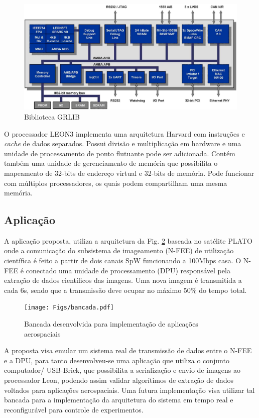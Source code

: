 \documentclass[journal,a4paper,oneside,twocolumn]{IEEEtran}
\begin{document}
	\begin{figure}[!t]
	\centering
	\includegraphics[width=1 \columnwidth,]{Figs/arq.pdf}
	\caption{Biblioteca GRLIB}
	\label{fig:arq}
	\end{figure}	 
	
	O processador LEON3 implementa uma arquitetura Harvard com 	instruções e \textit{cache} de dados separados. Possui divisão e multiplicação	em hardware e uma unidade de processamento de ponto flutuante pode ser 	adicionada. Contém também uma unidade de gerenciamento de memória que	possibilita o mapeamento de 32-bits de endereço virtual e 32-bits de memória. Pode funcionar com múltiplos processadores, os quais podem	compartilham uma mesma memória. 
	
\subsection{Aplicação}

	A aplicação proposta, utiliza a arquitetura da Fig. \ref{fig:bancada} baseada no satélite PLATO \cite{Plato} onde a comunicação do subsistema de imageamento (N-FEE) de utilização científica é feito a partir de dois canais SpW funcionando a 100Mbps casa. O N-FEE é conectado uma unidade de processamento (DPU) responsável pela extração de dados científicos das imagens. Uma nova imagem é transmitida a cada 6s, sendo que a transmissão deve ocupar no máximo 50$\%$ do tempo total.
	
	\begin{figure}[!t]
	\centering
	\texttt{[image: Figs/bancada.pdf]}
	\caption{Bancada desenvolvida para implementação de aplicações aerospaciais}
	\label{fig:bancada}
	\end{figure}	 
	
	A proposta visa emular um sistema real de transmissão de dados entre o N-FEE e a DPU, para tanto desenvolveu-se uma aplicação que utiliza o conjunto computador/ USB-Brick, que possibilita a serialização e envio de imagens ao processador Leon,  podendo assim validar algorítimos de extração de dados voltados para aplicações aerospaciais. Uma futura implementação visa utilizar tal bancada para a implementação da arquitetura  do sistema em tempo real e reconfigurável para controle de experimentos.
	
\end{document}
